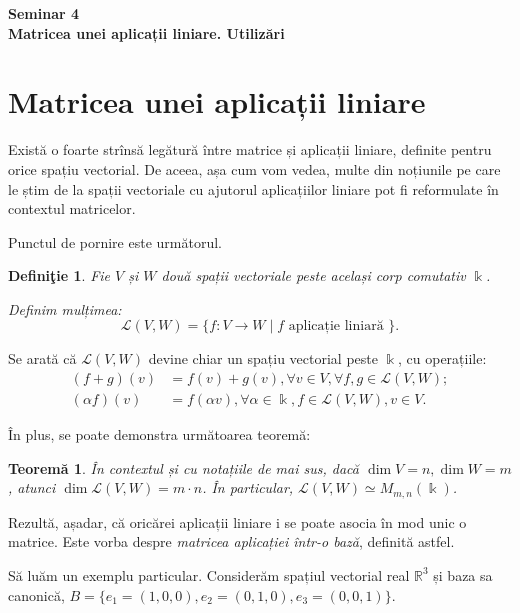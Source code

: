 \documentclass[11pt,a4paper]{article}
\newcommand\kal{\mathcal}
\newcommand\RR{\mathbb{R}}
\theoremstyle{dotless}
\newtheorem{theorem}{Teorem\u{a}}[section]
\theoremstyle{dotlessdr}
\newtheorem{definition}{Defini\c{t}ie}[section]
\begin{document}
\begin{center}
  {\large\textbf{Seminar 4 \\ Matricea unei aplicații liniare. Utilizări}}
\end{center}

\vspace{1cm}

\section{Matricea unei aplicații liniare}
\label{sec:mat-ap}

Există o foarte strînsă legătură între matrice și aplicații liniare, definite
pentru orice spațiu vectorial. De aceea, așa cum vom vedea, multe din noțiunile
pe care le știm de la spații vectoriale cu ajutorul aplicațiilor liniare pot fi
reformulate în contextul matricelor.

Punctul de pornire este următorul.

\begin{definition}\label{def:lvw}
  Fie $V$ și $W$ două spații vectoriale peste același corp comutativ $\Bbbk$.

  Definim mulțimea:
  \[
    \kal{L}(V, W) = \{ f : V \to W \mid f \text{ aplicație liniară } \}.
  \]
\end{definition}

Se arată că $\kal{L}(V, W)$ devine chiar un spațiu vectorial peste $\Bbbk$,
cu operațiile:
\begin{align*}
  (f + g)(v) &= f(v) + g(v), \forall v \in V, \forall f, g \in \kal{L}(V, W); \\
  (\alpha f)(v) &= f(\alpha v), \forall \alpha \in \Bbbk, f \in \kal{L}(V, W), v \in V.
\end{align*}

În plus, se poate demonstra următoarea teoremă:

\begin{theorem}\label{thm:mmn-apl}
  În contextul și cu notațiile de mai sus, dacă $\dim V = n, \dim W = m$, atunci
  $\dim \kal{L}(V, W) = m \cdot n$. În particular, $\kal{L}(V, W) \simeq M_{m, n}(\Bbbk)$.
\end{theorem}

Rezultă, așadar, că oricărei aplicații liniare i se poate asocia în mod unic
o matrice. Este vorba despre \emph{matricea aplicației într-o bază}, definită
astfel.

Să luăm un exemplu particular. Considerăm spațiul vectorial real $\RR^3$ și
baza sa canonică, $B = \{ e_1 = (1, 0, 0), e_2 = (0, 1, 0), e_3 = (0, 0, 1) \}$.
\end{document}
